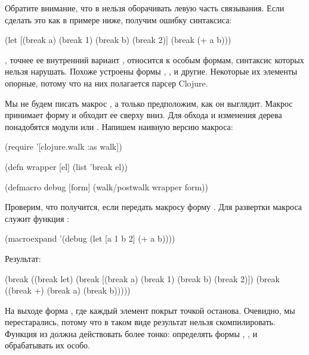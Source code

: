 Обратите внимание, что в  нельзя оборачивать левую часть связывания. Если сделать это как в примере ниже, получим ошибку синтаксиса:

\begin{english}
  \begin{clojure}
(let [(break a) (break 1)
      (break b) (break 2)]
  (break (+ a b)))
  \end{clojure}
\end{english}

, точнее ее внутренний вариант , относится к особым формам, синтаксис которых нельзя нарушать. Похоже устроены формы , ,  и другие. Некоторые их элементы опорные, потому что на них полагается парсер Clojure.

Мы не будем писать макрос , а только предположим, как он выглядит. Макрос принимает форму и обходит ее сверху вниз. Для обхода и изменения дерева понадобятся модули  или . Напишем наивную версию макроса:

\begin{english}
  \begin{clojure}
(require
  '[clojure.walk :as walk])

(defn wrapper
  [el]
  (list 'break el))

(defmacro debug
  [form]
  (walk/postwalk wrapper form))
  \end{clojure}
\end{english}

Проверим, что получится, если передать макросу форму . Для развертки макроса служит функция :

\begin{english}
  \begin{clojure}
(macroexpand
 '(debug
   (let [a 1 b 2]
     (+ a b))))
  \end{clojure}
\end{english}

Результат:

\begin{english}
  \begin{clojure}
(break
 ((break let)
  (break [(break a) (break 1)
          (break b) (break 2)])
  (break ((break +) (break a) (break b)))))
  \end{clojure}
\end{english}

На выходе форма , где каждый элемент покрыт точкой останова. Очевидно, мы перестарались, потому что в таком виде результат нельзя скомпилировать. Функция  из  должна действовать более тонко: определять формы , ,  и обрабатывать их особо.

